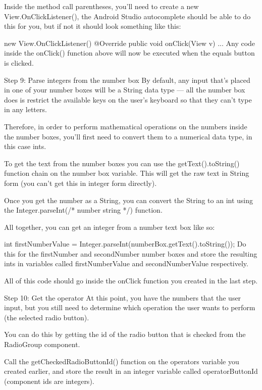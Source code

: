         Inside the method call parentheses, you’ll need to create a new View.OnClickListener(), the Android Studio autocomplete should be able to do this for you, but if not it should look something like this:

        new View.OnClickListener() {
        @Override
        public void onClick(View v) {...}
        }
        Any code inside the onClick() function above will now be executed when the equals button is clicked.

    Step 9: Parse integers from the number box
        By default, any input that’s placed in one of your number boxes will be a String data type — all the number box does is restrict the available keys on the user’s keyboard so that they can’t type in any letters.

        Therefore, in order to perform mathematical operations on the numbers inside the number boxes, you’ll first need to convert them to a numerical data type, in this case ints.

        To get the text from the number boxes you can use the getText().toString() function chain on the number box variable. This will get the raw text in String form (you can’t get this in integer form directly).

        Once you get the number as a String, you can convert the String to an int using the Integer.parseInt(/* number string */) function.

        All together, you can get an integer from a number text box like so:

        int firstNumberValue = Integer.parseInt(numberBox.getText().toString());
        Do this for the firstNumber and secondNumber number boxes and store the resulting ints in variables called firstNumberValue and secondNumberValue respectively.

        All of this code should go inside the onClick function you created in the last step.

    Step 10: Get the operator
        At this point, you have the numbers that the user input, but you still need to determine which operation the user wants to perform (the selected radio button).

        You can do this by getting the id of the radio button that is checked from the RadioGroup component.

        Call the getCheckedRadioButtonId() function on the operators variable you created earlier, and store the result in an integer variable called operatorButtonId (component ids are integers).

